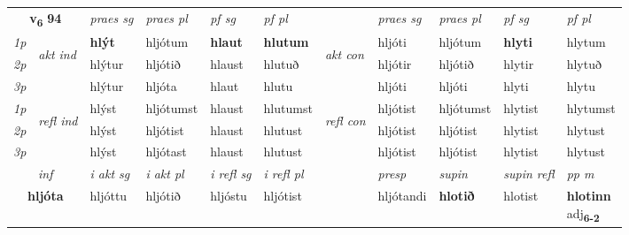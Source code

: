 \noindent
\begin{tabular}{lllllllllll} \toprule
\multicolumn{2}{c}{\textbf{v{\textsubscript{6}}} \Large{\textbf{94}}}  &  \textit{praes sg}  & \textit{praes pl}  &\textit{ pf sg} & \textit{pf pl} &  &  \textit{praes sg}  & \textit{praes pl}  & \textit{pf sg} & \textit{pf pl } \\*
	\cmidrule{3-6} \cmidrule{8-11}
 {\textit{1p}} & \multirow{3}{*}{\begin{turn}{90}\textit{akt ind}\end{turn}} & \textbf{hlýt} & hljótum & \textbf{hlaut} & \textbf{hlutum} & \multirow{3}{*}{\begin{turn}{90}\textit{akt con}\end{turn}} &hljóti & hljótum & \textbf{hlyti} & hlytum\\*
 {\textit{2p}} &  &  hlýtur  & hljótið & hlaust & hlutuð & & hljótir & hljótið & hlytir & hlytuð \\*
{\textit{3p}} &  & hlýtur & hljóta & hlaut & hlutu & & hljóti & hljóti& hlyti & hlytu \\*
\cmidrule{3-6} \cmidrule{8-11}
 {\textit{1p}} & \multirow{3}{*}{\begin{turn}{90}\textit{refl ind}\end{turn}}  & hlýst & hljótumst & hlaust & hlutumst & \multirow{3}{*}{\begin{turn}{90}\textit{refl con}\end{turn}}  &hljótist & hljótumst & hlytist & hlytumst \\*
 {\textit{2p}} &  & hlýst & hljótist & hlaust & hlutust & &hljótist & hljótist & hlytist & hlytust \\*
 {\textit{3p}}  & & hlýst & hljótast & hlaust & hlutust & & hljótist & hljótist& hlytist & hlytust \\*
\cmidrule{3-6} \cmidrule{8-11}

   \multicolumn{2}{c}{\textit{inf}}  & \textit{i akt sg} & \textit{i akt pl} & \textit{i refl sg} & \textit{i refl pl} && \textit{presp} & \textit{supin} & \textit{supin refl} & \textit{pp m} \\*
  \multicolumn{2}{c}{\textbf{hljóta}} & hljóttu  & hljótið & hljóstu & hljótist && hljótandi &  \textbf{hlotið} & hlotist & \specialcell{\textbf{hlotinn} \\ adj\textbf{\textsubscript{6-2}}} \\*
\end{tabular}

